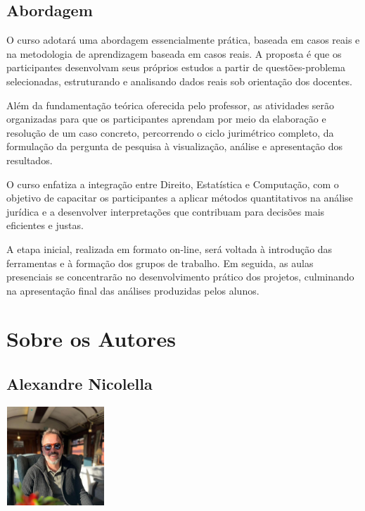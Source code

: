 \documentclass[
  letterpaper,
  DIV=11,
  numbers=noendperiod]{scrreprt}
\begin{document}
\section{\texorpdfstring{\textbf{Abordagem}}{Abordagem}}\label{abordagem}

O curso adotará uma abordagem essencialmente prática, baseada em casos
reais e na metodologia de aprendizagem baseada em casos reais. A
proposta é que os participantes desenvolvam seus próprios estudos a
partir de questões-problema selecionadas, estruturando e analisando
dados reais sob orientação dos docentes.

Além da fundamentação teórica oferecida pelo professor, as atividades
serão organizadas para que os participantes aprendam por meio da
elaboração e resolução de um caso concreto, percorrendo o ciclo
jurimétrico completo, da formulação da pergunta de pesquisa à
visualização, análise e apresentação dos resultados.

O curso enfatiza a integração entre Direito, Estatística e Computação,
com o objetivo de capacitar os participantes a aplicar métodos
quantitativos na análise jurídica e a desenvolver interpretações que
contribuam para decisões mais eficientes e justas.

A etapa inicial, realizada em formato on-line, será voltada à introdução
das ferramentas e à formação dos grupos de trabalho. Em seguida, as
aulas presenciais se concentrarão no desenvolvimento prático dos
projetos, culminando na apresentação final das análises produzidas pelos
alunos.


\chapter{Sobre os Autores}\label{sobre-os-autores}

\section{\texorpdfstring{\textbf{Alexandre
Nicolella}}{Alexandre Nicolella}}\label{alexandre-nicolella}

\includegraphics[width=1.45833in,height=1.45833in]{figuras/alexandre.jpg}
\end{document}
